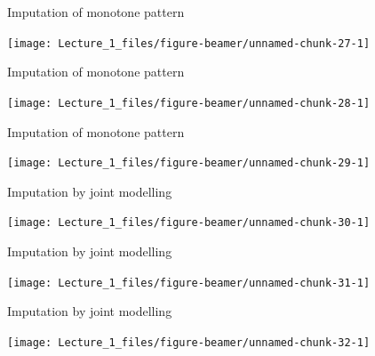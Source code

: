 \documentclass[ignorenonframetext,aspectratio=43]{beamer}
\begin{document}
\begin{frame}{Imputation of monotone pattern}
\protect\hypertarget{imputation-of-monotone-pattern-1}{}

\begin{center}\texttt{[image: Lecture\_1\_files/figure-beamer/unnamed-chunk-27-1]} \end{center}

\end{frame}

\begin{frame}{Imputation of monotone pattern}
\protect\hypertarget{imputation-of-monotone-pattern-2}{}

\begin{center}\texttt{[image: Lecture\_1\_files/figure-beamer/unnamed-chunk-28-1]} \end{center}

\end{frame}

\begin{frame}{Imputation of monotone pattern}
\protect\hypertarget{imputation-of-monotone-pattern-3}{}

\begin{center}\texttt{[image: Lecture\_1\_files/figure-beamer/unnamed-chunk-29-1]} \end{center}

\end{frame}

\begin{frame}{Imputation by joint modelling}
\protect\hypertarget{imputation-by-joint-modelling}{}

\begin{center}\texttt{[image: Lecture\_1\_files/figure-beamer/unnamed-chunk-30-1]} \end{center}

\end{frame}

\begin{frame}{Imputation by joint modelling}
\protect\hypertarget{imputation-by-joint-modelling-1}{}

\begin{center}\texttt{[image: Lecture\_1\_files/figure-beamer/unnamed-chunk-31-1]} \end{center}

\end{frame}

\begin{frame}{Imputation by joint modelling}
\protect\hypertarget{imputation-by-joint-modelling-2}{}

\begin{center}\texttt{[image: Lecture\_1\_files/figure-beamer/unnamed-chunk-32-1]} \end{center}

\end{frame}
\end{document}
